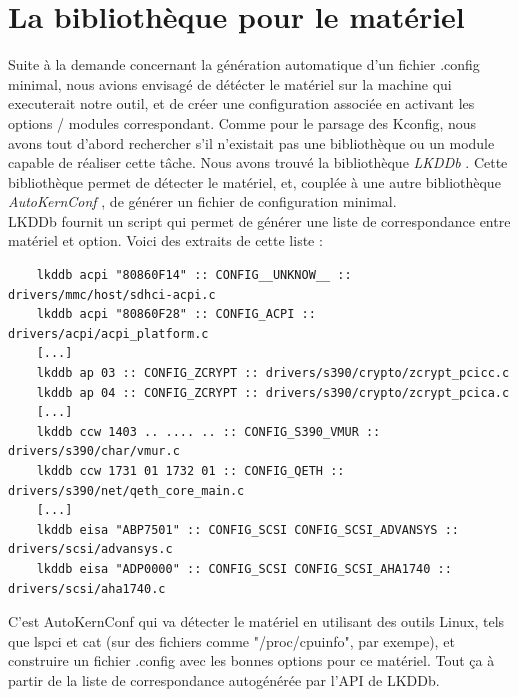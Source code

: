 \documentclass[16pts]{report}
\begin{document}
        \section{La bibliothèque pour le matériel}
    \label{sec:La bibliothèque pour le matériel}

    Suite à la demande concernant la génération automatique d'un fichier
    .config minimal, nous avions envisagé de détécter le matériel sur la
    machine qui executerait notre outil, et de créer une configuration associée
    en activant les options / modules correspondant. Comme pour le parsage des
    Kconfig, nous avons tout d'abord rechercher s'il n'existait pas une
    bibliothèque ou un module capable de réaliser cette tâche. Nous avons
    trouvé la bibliothèque \textit{LKDDb} \cite{Existant:lib:lkddb}. Cette
    bibliothèque permet de détecter le matériel, et, couplée à une autre
    bibliothèque \textit{AutoKernConf} \cite{Existant:lib:autoKernConf}, de
    générer un fichier de configuration minimal. \\

    LKDDb fournit un script qui permet de générer une liste de correspondance
    entre matériel et option. Voici des extraits de cette liste : \\

    \begin{verbatim}
    lkddb acpi "80860F14" :: CONFIG__UNKNOW__ :: drivers/mmc/host/sdhci-acpi.c
    lkddb acpi "80860F28" :: CONFIG_ACPI :: drivers/acpi/acpi_platform.c
    [...]
    lkddb ap 03 :: CONFIG_ZCRYPT :: drivers/s390/crypto/zcrypt_pcicc.c
    lkddb ap 04 :: CONFIG_ZCRYPT :: drivers/s390/crypto/zcrypt_pcica.c
    [...]
    lkddb ccw 1403 .. .... .. :: CONFIG_S390_VMUR :: drivers/s390/char/vmur.c
    lkddb ccw 1731 01 1732 01 :: CONFIG_QETH :: drivers/s390/net/qeth_core_main.c
    [...]
    lkddb eisa "ABP7501" :: CONFIG_SCSI CONFIG_SCSI_ADVANSYS :: drivers/scsi/advansys.c
    lkddb eisa "ADP0000" :: CONFIG_SCSI CONFIG_SCSI_AHA1740 :: drivers/scsi/aha1740.c
    \end{verbatim}

    C'est AutoKernConf qui va détecter le matériel en utilisant des outils
    Linux, tels que lspci et cat (sur des fichiers comme "/proc/cpuinfo", par
    exempe), et construire un fichier .config avec les bonnes options pour ce
    matériel. Tout ça à partir de la liste de correspondance autogénérée par
    l'API de LKDDb. \\
\end{document}

